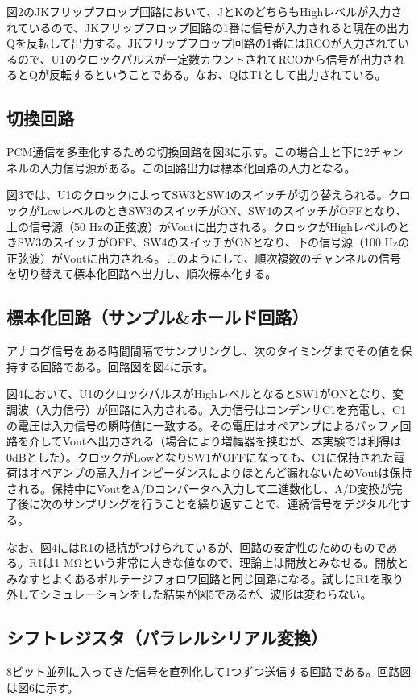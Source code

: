 \documentclass[
  a4paper,
  11pt,
]{ltjsarticle}
\begin{document}
図2のJKフリップフロップ回路において、JとKのどちらもHighレベルが入力されているので、JKフリップフロップ回路の1番に信号が入力されると現在の出力Qを反転して出力する。JKフリップフロップ回路の1番にはRCOが入力されているので、U1のクロックパルスが一定数カウントされてRCOから信号が出力されるとQが反転するということである。なお、QはT1として出力されている。

\subsection{切換回路}
PCM通信を多重化するための切換回路を図3に示す。この場合上と下に2チャンネルの入力信号源がある。この回路出力は標本化回路の入力となる。

図3では、U1のクロックによってSW3とSW4のスイッチが切り替えられる。クロックがLowレベルのときSW3のスイッチがON、SW4のスイッチがOFFとなり、上の信号源（50 \si{\hertz}の正弦波）がVoutに出力される。クロックがHighレベルのときSW3のスイッチがOFF、SW4のスイッチがONとなり、下の信号源（100 \si{\hertz}の正弦波）がVoutに出力される。このようにして、順次複数のチャンネルの信号を切り替えて標本化回路へ出力し、順次標本化する。

\subsection{標本化回路（サンプル\&ホールド回路）}
アナログ信号をある時間間隔でサンプリングし、次のタイミングまでその値を保持する回路である。回路図を図4に示す。

図4において、U1のクロックパルスがHighレベルとなるとSW1がONとなり、変調波（入力信号）が回路に入力される。入力信号はコンデンサC1を充電し、C1の電圧は入力信号の瞬時値に一致する。その電圧はオペアンプによるバッファ回路を介してVoutへ出力される（場合により増幅器を挟むが、本実験では利得は0dBとした）。クロックがLowとなりSW1がOFFになっても、C1に保持された電荷はオペアンプの高入力インピーダンスによりほとんど漏れないためVoutは保持される。保持中にVoutをA/Dコンバータへ入力して二進数化し、A/D変換が完了後に次のサンプリングを行うことを繰り返すことで、連続信号をデジタル化する。

なお、図4にはR1の抵抗がつけられているが、回路の安定性のためのものである。R1は1 \si{\mega\ohm}という非常に大きな値なので、理論上は開放とみなせる。開放とみなすとよくあるボルテージフォロワ回路と同じ回路になる。試しにR1を取り外してシミュレーションをした結果が図5であるが、波形は変わらない。

\subsection{シフトレジスタ（パラレルシリアル変換）}
8ビット並列に入ってきた信号を直列化して1つずつ送信する回路である。回路図は図6に示す。
\end{document}
